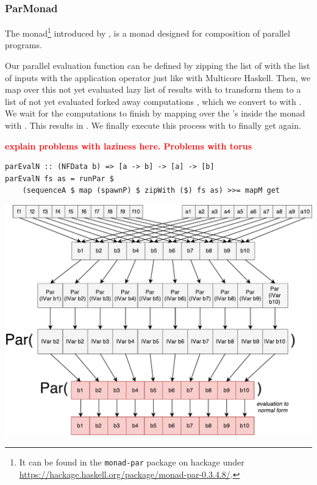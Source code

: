 \subsubsection{ParMonad}
The  monad\footnote{It can be found in the \texttt{monad-par} package on hackage under \url{https://hackage.haskell.org/package/monad-par-0.3.4.8/}.} introduced by \citet{monad_par_paper_2011}, is a monad designed for composition of parallel programs.


Our parallel evaluation function  can be defined by zipping the list of \code{[a -> b]} with the list of inputs \code{[a]} with the application operator \code{\$} just like with Multicore Haskell. Then, we map over this not yet evaluated lazy list of results \code{[b]} with  to transform them to a list of not yet evaluated forked away computations , which we convert to  with . We wait for the computations to finish by mapping over the 's inside the  monad with . This results in . We finally execute this process with  to finally get \code{[b]} again.

\textbf{\textcolor{red}{explain problems with laziness here. Problems with torus}}

\begin{lstlisting}[frame=htrbl]
parEvalN :: (NFData b) => [a -> b] -> [a] -> [b]
parEvalN fs as = runPar $ 
	(sequenceA $ map (spawnP) $ zipWith ($) fs as) >>= mapM get
\end{lstlisting}
\begin{center}
	\includegraphics[scale=0.5]{images/parEvalNParMonad}
\end{center}

